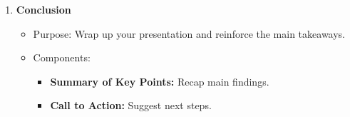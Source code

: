 \documentclass[aspectratio=169]{beamer}
\begin{document}
\begin{frame}[fragile]
\begin{enumerate}
\begin{itemize}
            \end{itemize}
        \item \textbf{Conclusion}
            \begin{itemize}
                \item Purpose: Wrap up your presentation and reinforce the main takeaways.
                \item Components:
                    \begin{itemize}
                        \item \textbf{Summary of Key Points:} Recap main findings.
                        \item \textbf{Call to Action:} Suggest next steps.
                    \end{itemize}
            \end{itemize}
    \end{enumerate}
\end{frame}
\end{document}
